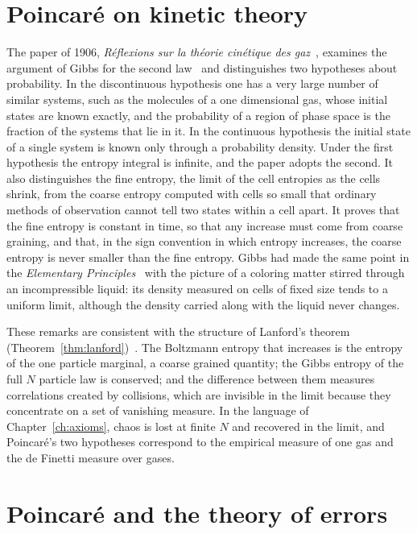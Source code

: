 \section{Poincar\'e on kinetic theory}

The paper of 1906, \emph{R\'eflexions sur la th\'eorie cin\'etique des gaz}~\cite{poincare1906}, examines the argument of Gibbs for the second law~\cite{gibbs1902} and distinguishes two hypotheses about probability. In the discontinuous hypothesis one has a very large number of similar systems, such as the molecules of a one dimensional gas, whose initial states are known exactly, and the probability of a region of phase space is the fraction of the systems that lie in it. In the continuous hypothesis the initial state of a single system is known only through a probability density. Under the first hypothesis the entropy integral is infinite, and the paper adopts the second. It also distinguishes the fine entropy, the limit of the cell entropies as the cells shrink, from the coarse entropy computed with cells so small that ordinary methods of observation cannot tell two states within a cell apart. It proves that the fine entropy is constant in time, so that any increase must come from coarse graining, and that, in the sign convention in which entropy increases, the coarse entropy is never smaller than the fine entropy. Gibbs had made the same point in the \emph{Elementary Principles}~\cite[Chapter~XII]{gibbs1902} with the picture of a coloring matter stirred through an incompressible liquid: its density measured on cells of fixed size tends to a uniform limit, although the density carried along with the liquid never changes.

These remarks are consistent with the structure of Lanford's theorem (Theorem~\ref{thm:lanford})~\cite{lanford1975}. The Boltzmann entropy that increases is the entropy of the one particle marginal, a coarse grained quantity; the Gibbs entropy of the full $N$ particle law is conserved; and the difference between them measures correlations created by collisions, which are invisible in the limit because they concentrate on a set of vanishing measure. In the language of Chapter~\ref{ch:axioms}, chaos is lost at finite $N$ and recovered in the limit, and Poincar\'e's two hypotheses correspond to the empirical measure of one gas and the de Finetti measure over gases.

\section{Poincar\'e and the theory of errors}

